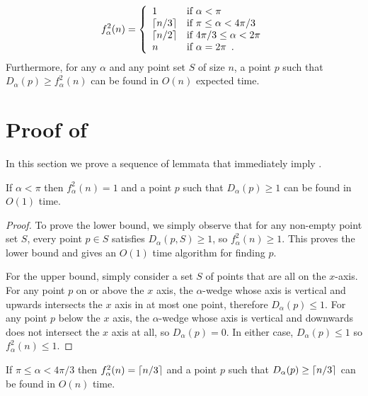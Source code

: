 \documentclass[lotsofwhite]{patmorin}
\begin{document}
\begin{thm}
\[
   f^2_\alpha(n) = \left\{\begin{array}{ll}
                        1 & \mbox{if $\alpha < \pi$} \\
                        \left\lceil n/3 \right\rceil & \mbox{if $\pi\le \alpha < 4\pi/3$} \\
                        \left\lceil n/2 \right\rceil & \mbox{if $4\pi/3\le \alpha < 2\pi$} \\
                        n & \mbox{if $\alpha = 2\pi$\enspace .} 
                       \end{array}\right.
\]
Furthermore, for any $\alpha$ and any point set $S$ of size $n$, a
point $p$ such that $D_\alpha(p) \ge
f^2_\alpha(n)$ can be found in $O(n)$ expected time.
\end{thm}

\section{Proof of }

In this section we prove a sequence of lemmata that immediately imply
.

\begin{lem}
If $\alpha < \pi$ then $f^2_\alpha(n) = 1$ and a point $p$ such that
$D_\alpha(p)\ge 1$ can be found in $O(1)$ time.
\end{lem}

\begin{proof}
To prove the lower bound, we simply observe that for any non-empty
point set $S$, every point $p\in S$ satisfies $D_\alpha(p,S)\ge 1$, so
$f^2_\alpha(n) \ge 1$. This proves the lower bound and gives an $O(1)$
time algorithm for finding $p$. 

For the upper bound, simply consider a set $S$ of points that are all
on the $x$-axis.  For any point $p$ on or above the $x$ axis, the
$\alpha$-wedge whose axis is vertical and upwards intersects the $x$
axis in at most one point, therefore $D_\alpha(p) \le 1$.  For any
point $p$ below the $x$ axis, the $\alpha$-wedge whose axis is
vertical and downwards does not intersect the $x$ axis at all, so
$D_\alpha(p)=0$.  In either case, $D_\alpha(p)\le 1$ so $f^2_\alpha(n)
\le 1$.
\end{proof}

\begin{lem}
If $\pi\le \alpha < 4\pi/3$ then $f^2_\alpha(n) = \left\lceil n/3 \right\rceil$ and a
point $p$ such that $D_\alpha(p)\ge \left\lceil n/3 \right\rceil$ can be found in $O(n)$ time.
\end{lem}
\end{document}
